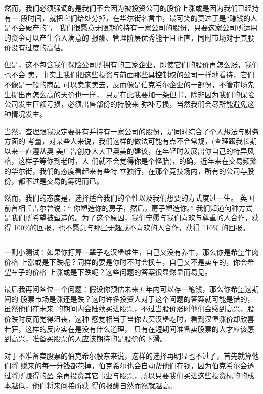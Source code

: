 \documentclass[UTF8,a4paper,zihao=-4,fontset = windows]{ctexart} %
\begin{document}
然而，我们必须强调的是我们不会因为被投资公司的股价上涨或是因为我们已经持有一
段时间，就把它们给处分掉，在华尔街名言中，最可笑的莫过于是“赚钱的人是不会破产的”，
我们很愿意无限期的持有一家公司的股份，只要这家公司所运用的资金可以产生令人满意的
报酬、管理阶层优秀能干且正直，同时市场对于其股价没有过度的高估。

但是，这不包含我们保险公司所拥有的三家企业，即使它们的股价再怎么涨，我们也不会
卖，事实上我们把这些投资与前面那些具控制权的公司一样地看待，它们不像是一般的商品
可以卖来卖去，反而像是伯克希尔企业的一部份，不管市场先生提出再怎么高的天价也一样，
只是在此我要加一条但书，除非因为我们的保险公司发生巨额亏损，必须出售部份的持股来
弥补亏损，当然我们会尽所能避免这种情况发生。

当然，查理跟我决定要拥有并持有一家公司的股份，是同时综合了个人想法与财务方面的
考量，对某些人来说，我们这样的做法可能有点不合常规，(查理跟我长期以来一直遵从奥
美广告创办人大卫奥美的建议，在年轻时发展出你自己的特异风格，这样子等你到老时，人
们就不会觉得你是个怪胎)，的确，近年来在交易频繁的华尔街，我们的态度看起来有些特
立独行，在那个竞技场内，所有的公司与股份，都不过是交易的筹码而已。

然而，我们的态度是，选择适合我们的个性以及我们想要的方式度过一生。 英国前首相丘吉尔曾说：“ 你塑造你的房子，然后，房子塑造你。” 我们知道何种方式是我们所希望被塑造的。为了这个原因，我们宁愿与我们喜欢与尊重的人合作，获得 100\%的回报，也不愿意与那些无趣或不喜欢的人合作，获得 110\% 的回报。

\rule{10cm}{0.4pt}

一则小测试︰如果你打算一辈子吃汉堡维生，自己又没有养牛，那么你是希望牛肉价格
上涨或是下跌呢？同样的要是你时不时会换车，自己又不是卖车的，你会希望车子的价格
上涨或是下跌呢？这些问题的答案很显然显而易见。

最后我再问各位一个问题︰假设你预估未来五年内可以存一笔钱，那么你希望这期间的
股票市场是涨还是跌？这时许多投资人对于这个问题的答案就可能是错的，虽然他们在未来
的期间内会陆续买进股票，不过当股价涨时他们会感到高兴，股价跌时反而觉得沮丧，这种
感觉相当于当你去买汉堡吃时，看到汉堡涨价却欣喜若狂，这样的反应实在是没有什么道理，
只有在短期间准备卖股票的人才应该感到高兴，准备买股票的人应该期待的是股价的下滑。

对于不准备卖股票的伯克希尔股东来说，这样的选择再明显也不过了，首先就算他们将
赚来的每一分钱都花掉，伯克希尔也会自动帮他们存钱，因为伯克希尔会透过将所赚得的盈
余再投资其它事业与股票，所以只要我们买进这些投资标的的成本越低，他们将来间接所获
得的报酬自然而然就越高。
\end{document}
